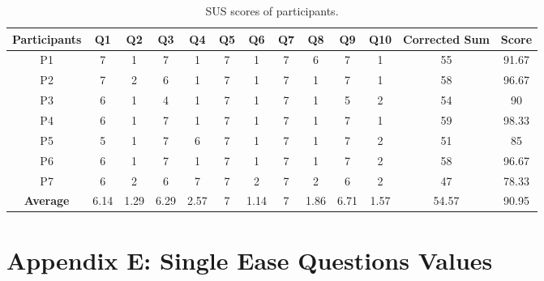 \begin{table}
    \centering
    \begin{tabular}{c c c c c c c c c c c c c}
        \hline
        \textbf{Participants} & \textbf{Q1} & \textbf{Q2} & \textbf{Q3} & \textbf{Q4} & \textbf{Q5} & \textbf{Q6} & \textbf{Q7} & \textbf{Q8} & \textbf{Q9} & \textbf{Q10} & \textbf{Corrected Sum} & \textbf{Score} \\
        \hline
        P1 & 7 & 1 & 7 & 1 & 7 & 1 & 7 & 6 & 7 & 1 & 55 & 91.67 \\
        \hline
        P2 & 7 & 2 & 6 & 1 & 7 & 1 & 7 & 1 & 7 & 1 & 58 & 96.67 \\
        \hline
        P3 & 6 & 1 & 4 & 1 & 7 & 1 & 7 & 1 & 5 & 2 & 54 & 90 \\
        \hline
        P4 & 6 & 1 & 7 & 1 & 7 & 1 & 7 & 1 & 7 & 1 & 59 & 98.33 \\
        \hline
        P5 & 5 & 1 & 7 & 6 & 7 & 1 & 7 & 1 & 7 & 2 & 51 & 85 \\
        \hline
        P6 & 6 & 1 & 7 & 1 & 7 & 1 & 7 & 1 & 7 & 2 & 58 & 96.67 \\
        \hline
        P7 & 6 & 2 & 6 & 7 & 7 & 2 & 7 & 2 & 6 & 2 & 47 & 78.33 \\
        \hline
        \textbf{Average} & 6.14 & 1.29 & 6.29 & 2.57 & 7 & 1.14 & 7 & 1.86 & 6.71 & 1.57 & 54.57 & 90.95 \\
        \hline
    \end{tabular}
    \vspace{1em}
    \caption*{SUS scores of participants.}
    \label{table:sus_scoring}
\end{table}

\clearpage

\section*[Appendix E]{Appendix E: Single Ease Questions Values}\label{appendix:seq}

